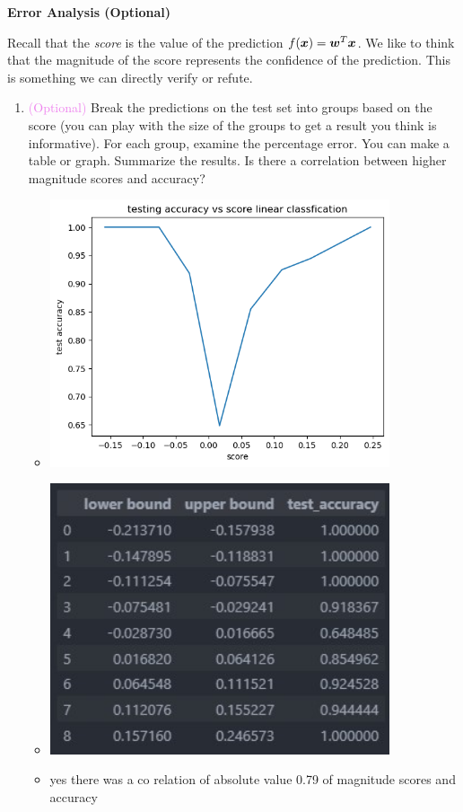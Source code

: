 \documentclass{article}
\newcommand{\nyuparagrah}[1]{\textcolor{nyupurple}{\large #1}}
\theoremstyle{plain}
\theoremstyle{definition}
\begin{document}
\nyuparagrah{\bf Error Analysis {(Optional)}}

Recall that the \emph{score} is the value of the prediction
$f(\boldsymbol{x})=\boldsymbol{w}^{T} \boldsymbol{x}$. We like to think that the magnitude of the score represents
the confidence of the prediction. This is something we can directly
verify or refute.

\begin{enumerate}
  \setcounter{enumi}{\value{saveenum}}
\item  \textcolor{violet}{(Optional)} Break the predictions on the test set into groups based on the score
(you can play with the size of the groups to get a result you think
is informative). For each group, examine the percentage error. You
can make a table or graph. Summarize the results. Is there a correlation
between higher magnitude scores and accuracy?\\
\begin{itemize}
    \color{blue}
                    \item \includegraphics[width=10cm]{homework/homework_3/immages/question_13_1.png}
                    \item \includegraphics[width=10cm]{homework/homework_3/immages/question_13_2.png.jpg}
    \item yes there was a co relation of absolute value 0.79 of magnitude scores and accuracy
\end{itemize}



\setcounter{saveenum}{\value{enumi}}
\end{enumerate}
\end{document}
